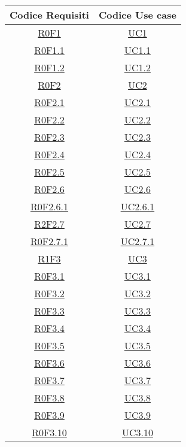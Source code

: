\normalsize
\begin{longtable}{|c|c|}
\hline
\textbf{Codice Requisiti} & \textbf{Codice Use case} \\
\hline
\endhead
\hyperlink{R0F1}{R0F1} & \hyperlink{UC1}{UC1}\\
\hline
\hyperlink{R0F1.1}{R0F1.1} & \hyperlink{UC1.1}{UC1.1}\\
\hline
\hyperlink{R0F1.2}{R0F1.2} & \hyperlink{UC1.2}{UC1.2}\\
\hline
\hyperlink{R0F2}{R0F2} & \hyperlink{UC2}{UC2}\\
\hline
\hyperlink{R0F2.1}{R0F2.1} & \hyperlink{UC2.1}{UC2.1}\\
\hline
\hyperlink{R0F2.2}{R0F2.2} & \hyperlink{UC2.2}{UC2.2}\\
\hline
\hyperlink{R0F2.3}{R0F2.3} & \hyperlink{UC2.3}{UC2.3}\\
\hline
\hyperlink{R0F2.4}{R0F2.4} & \hyperlink{UC2.4}{UC2.4}\\
\hline
\hyperlink{R0F2.5}{R0F2.5} & \hyperlink{UC2.5}{UC2.5}\\
\hline
\hyperlink{R0F2.6}{R0F2.6} & \hyperlink{UC2.6}{UC2.6}\\
\hline
\hyperlink{R0F2.6.1}{R0F2.6.1} & \hyperlink{UC2.6.1}{UC2.6.1}\\
\hline
\hyperlink{R2F2.7}{R2F2.7} & \hyperlink{UC2.7}{UC2.7}\\
\hline
\hyperlink{R0F2.7.1}{R0F2.7.1} & \hyperlink{UC2.7.1}{UC2.7.1}\\
\hline
\hyperlink{R1F3}{R1F3} & \hyperlink{UC3}{UC3}\\
\hline
\hyperlink{R0F3.1}{R0F3.1} & \hyperlink{UC3.1}{UC3.1}\\
\hline
\hyperlink{R0F3.2}{R0F3.2} & \hyperlink{UC3.2}{UC3.2}\\
\hline
\hyperlink{R0F3.3}{R0F3.3} & \hyperlink{UC3.3}{UC3.3}\\
\hline
\hyperlink{R0F3.4}{R0F3.4} & \hyperlink{UC3.4}{UC3.4}\\
\hline
\hyperlink{R0F3.5}{R0F3.5} & \hyperlink{UC3.5}{UC3.5}\\
\hline
\hyperlink{R0F3.6}{R0F3.6} & \hyperlink{UC3.6}{UC3.6}\\
\hline
\hyperlink{R0F3.7}{R0F3.7} & \hyperlink{UC3.7}{UC3.7}\\
\hline
\hyperlink{R0F3.8}{R0F3.8} & \hyperlink{UC3.8}{UC3.8}\\
\hline
\hyperlink{R0F3.9}{R0F3.9} & \hyperlink{UC3.9}{UC3.9}\\
\hline
\hyperlink{R0F3.10}{R0F3.10} & \hyperlink{UC3.10}{UC3.10}\\

\end{longtable}
